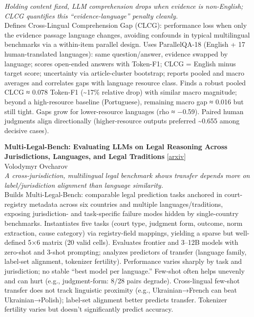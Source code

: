 \documentclass[12pt,letterpaper]{article}
\begin{document}
{\small\textit{Holding content fixed, LLM comprehension drops when evidence is non-English; CLCG quantifies this ``evidence-language'' penalty cleanly.}}\\[1pt]
{\footnotesize Defines Cross-Lingual Comprehension Gap (CLCG): performance loss when only the evidence passage language changes, avoiding confounds in typical multilingual benchmarks via a within-item parallel design. Uses ParallelQA-18 (English + 17 human-translated languages): same question/answer, evidence swapped by language; scores open-ended answers with Token-F1; CLCG = English minus target score; uncertainty via article-cluster bootstrap; reports pooled and macro averages and correlates gaps with language resource class. Finds a robust pooled CLCG ≈ 0.078 Token-F1 (\textasciitilde{}17\% relative drop) with similar macro magnitude; beyond a high-resource baseline (Portuguese), remaining macro gap ≈ 0.016 but still tight. Gaps grow for lower-resource languages (rho ≈ −0.59). Paired human judgments align directionally (higher-resource outputs preferred \textasciitilde{}0.655 among decisive cases).}

\medskip

{\small\textbf{Multi-Legal-Bench: Evaluating LLMs on Legal Reasoning Across Jurisdictions, Languages, and Legal Traditions}} {\scriptsize[\href{https://arxiv.org/abs/2605.29738}{arxiv}]}\\
{\scriptsize Volodymyr Ovcharov}\\

{\small\textit{A cross-jurisdiction, multilingual legal benchmark shows transfer depends more on label/jurisdiction alignment than language similarity.}}\\[1pt]
{\footnotesize Builds Multi-Legal-Bench: comparable legal prediction tasks anchored in court-registry metadata across six countries and multiple languages/traditions, exposing jurisdiction- and task-specific failure modes hidden by single-country benchmarks. Instantiates five tasks (court type, judgment form, outcome, norm extraction, cause category) via registry-field mappings, yielding a sparse but well-defined 5×6 matrix (20 valid cells). Evaluates frontier and 3--12B models with zero-shot and 3-shot prompting; analyzes predictors of transfer (language family, label-set alignment, tokenizer fertility). Performance varies sharply by task and jurisdiction; no stable ``best model per language.'' Few-shot often helps unevenly and can hurt (e.g., judgment-form: 8/28 pairs degrade). Cross-lingual few-shot transfer does not track linguistic proximity (e.g., Ukrainian→French can beat Ukrainian→Polish); label-set alignment better predicts transfer. Tokenizer fertility varies but doesn't significantly predict accuracy.}
\end{document}

